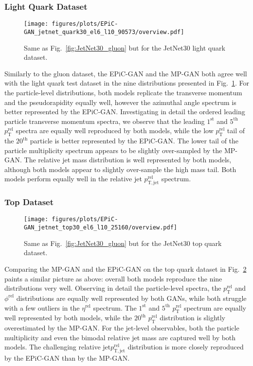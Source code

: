\documentclass[a4paper,submission, Phys]{SciPost}
\DeclareRobustCommand{\Fig}[1]{Fig.~\ref{fig:#1}}
\begin{document}
\subsubsection{Light Quark Dataset}

\begin{figure}[tbp]
\centering
\texttt{[image: figures/plots/EPiC-GAN\_jetnet\_quark30\_el6\_l10\_90573/overview.pdf]}
\caption{Same as \Fig{JetNet30_gluon} but for the JetNet30 light quark dataset.}
\label{fig:JetNet30_quark}
\end{figure}

Similarly to the gluon dataset, the EPiC-GAN and the MP-GAN both agree well with the light quark test dataset in the nine distributions presented in \Fig{JetNet30_quark}. 
%
For the particle-level distributions, both models replicate the transverse momentum and the pseudorapidity equally well, however the azimuthal angle spectrum is better represented by the EPiC-GAN. 
%
Investigating in detail the ordered leading particle transverse momentum spectra, we observe that the leading $1^\mathrm{st}$ and $5^\mathrm{th}$ $p_\mathrm{T}^\mathrm{rel}$ spectra are equally well reproduced by both models, while the low $p_\mathrm{T}^\mathrm{rel}$ tail of the $20^\mathrm{th}$ particle is better represented by the EPiC-GAN. 
%
The lower tail of the particle multiplicity spectrum appears to be slightly over-sampled by the MP-GAN. 
%
The relative jet mass distribution is well represented by both models, although both models appear to slightly over-sample the high mass tail. 
%
Both models perform equally well in the relative jet $p_\mathrm{T,jet}^\mathrm{rel}$ spectrum.



\subsubsection{Top Dataset}

\begin{figure}[tbp]
\centering
\texttt{[image: figures/plots/EPiC-GAN\_jetnet\_top30\_el6\_l10\_25160/overview.pdf]}
\caption{Same as \Fig{JetNet30_gluon} but for the JetNet30 top quark dataset.}
\label{fig:JetNet30_top}
\end{figure}


Comparing the MP-GAN and the EPiC-GAN on the top quark dataset in \Fig{JetNet30_top} paints a similar picture as above: overall both models reproduce the nine distributions very well. 
%
Observing in detail the particle-level spectra, the $p_\mathrm{T}^\mathrm{rel}$ and $\phi^\mathrm{rel}$ distributions are equally well represented by both GANs, while both struggle with a few outliers in the $\eta^\mathrm{rel}$ spectrum.
%
The $1^\mathrm{st}$ and $5^\mathrm{th}$ $p_\mathrm{T}^\mathrm{rel}$ spectrum are equally well represented by both models, while the $20^\mathrm{th}$ $p_\mathrm{T}^\mathrm{rel}$ distribution is slightly overestimated by the MP-GAN.
%
For the jet-level observables, both the particle multiplicity and even the bimodal relative jet mass are captured well by both models.
%
The challenging relative jet$p_\mathrm{T,jet}^\mathrm{rel}$ distribution is more closely reproduced by the EPiC-GAN than by the MP-GAN.
\end{document}
